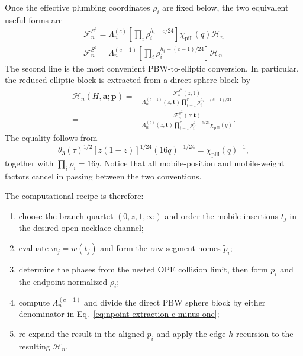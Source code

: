 \documentclass[11pt]{article}
\newcommand{\cF}{\mathcal F}
\newcommand{\cH}{\mathcal H}
\begin{document}
Once the effective plumbing coordinates $\rho_i$ are fixed below, the two
equivalent useful forms are
\begin{align}
 \boxed{\cF_n^{S^2}
 ={}
 \Lambda_n^{(c)}
 \left[\prod_i\rho_i^{h_i-c/24}\right]
 \chi_{\mathrm{pill}}(q)\cH_n}
 \label{eq:npoint-full-c}\\
 \boxed{\cF_n^{S^2}
 ={}
 \Lambda_n^{(c-1)}
 \left[\prod_i\rho_i^{h_i-(c-1)/24}\right]\cH_n}
 \label{eq:npoint-full-c-minus-one}
\end{align}
The second line is the most convenient PBW-to-elliptic conversion.  In
particular, the reduced elliptic block is extracted from a direct sphere
block by
\begin{equation}
 \boxed{\begin{aligned}
 \cH_n(H,\boldsymbol a;\boldsymbol p)
 ={}&
 \frac{\cF_n^{S^2}(z;\boldsymbol t)}
 {\Lambda_n^{(c-1)}(z;\boldsymbol t)
  \displaystyle\prod_{i=1}^{r}
  \rho_i^{h_i-(c-1)/24}}
 \\[1mm]
 ={}&
 \frac{\cF_n^{S^2}(z;\boldsymbol t)}
 {\Lambda_n^{(c)}(z;\boldsymbol t)
  \displaystyle\prod_{i=1}^{r}\rho_i^{h_i-c/24}
  \chi_{\mathrm{pill}}(q)}.
 \end{aligned}}
 \label{eq:npoint-extraction-c-minus-one}
\end{equation}
The equality follows from
\begin{equation}
 \theta_3(\tau)^{1/2}[z(1-z)]^{1/24}(16q)^{-1/24}
 =\chi_{\mathrm{pill}}(q)^{-1},
 \label{eq:npoint-theta-character-identity}
\end{equation}
together with $\prod_i\rho_i=16q$.  Notice that all mobile-position and
mobile-weight factors cancel in passing between the two conventions.

The computational recipe is therefore:
\begin{enumerate}
 \item choose the branch quartet $(0,z,1,\infty)$ and order the mobile
 insertions $t_j$ in the desired open-necklace channel;
 \item evaluate $w_j=w(t_j)$ and form the raw segment nomes
 $\widetilde p_i$;
 \item determine the phases from the nested OPE collision limit, then form
 $p_i$ and the endpoint-normalized $\rho_i$;
 \item compute $\Lambda_n^{(c-1)}$ and divide the direct PBW sphere block
 by either denominator in Eq.~\eqref{eq:npoint-extraction-c-minus-one};
 \item re-expand the result in the aligned $p_i$ and apply the edge
 $h$-recursion to the resulting $\cH_n$.
\end{enumerate}
\end{document}
